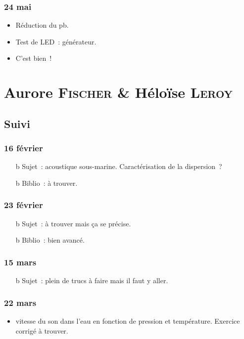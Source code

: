 \documentclass[a4paper, 11pt, final, garamond]{book}
\begin{document}
\subsection{24 mai}
\begin{itemize}
	\item Réduction du pb.
	\item Test de LED~: générateur.
	\item C'est bien~!
\end{itemize}

\chapter{Aurore \textsc{Fischer} \& Héloïse \textsc{Leroy}}
\label{ch:fischerleroy}

\section{Suivi}
\subsection{16 février}
\begin{itemize}
	\item[b]{Sujet}~: acoustique sous-marine. Caractérisation de la dispersion~?
	\item[b]{Biblio}~: à trouver.
\end{itemize}

\subsection{23 février}
\begin{itemize}
	\item[b]{Sujet}~: à trouver mais ça se précise.
	\item[b]{Biblio}~: bien avancé.
\end{itemize}

\subsection{15 mars}
\begin{itemize}
	\item[b]{Sujet}~: plein de trucs à faire mais il faut y aller.
\end{itemize}

\subsection{22 mars}
\begin{itemize}
	\item vitesse du son dans l'eau en fonction de pression et température.
	      Exercice corrigé à trouver.
\end{itemize}
\end{document}
